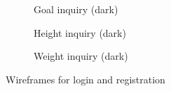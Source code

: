 \documentclass[../main.tex]{subfiles}
\begin{document}
\begin{figure}
\begin{subfigure}{.24\textwidth}
    \end{subfigure}\hfill
    \begin{subfigure}{.24\textwidth}
    \centering
    \caption{Goal inquiry (dark)}
    \end{subfigure}\hfill
    \begin{subfigure}{.24\textwidth}
    \centering
    \caption{Height inquiry (dark)}
    \end{subfigure}\hfill
    \begin{subfigure}{.24\textwidth}
    \centering
    \caption{Weight inquiry (dark)}
    \end{subfigure}
    \caption{Wireframes for login and registration}
\end{figure}
\end{document}
